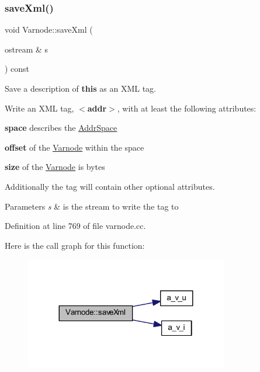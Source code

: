 \subsubsection{\texorpdfstring{saveXml()}{saveXml()}}
{\footnotesize\ttfamily void Varnode\+::save\+Xml (\begin{DoxyParamCaption}\item[{ostream \&}]{s }\end{DoxyParamCaption}) const}



Save a description of {\bfseries{this}} as an X\+ML tag. 

Write an X\+ML tag, {\bfseries{$<$addr$>$}}, with at least the following attributes\+:
\begin{DoxyItemize}
\item {\bfseries{space}} describes the \mbox{\hyperlink{class_addr_space}{Addr\+Space}}
\item {\bfseries{offset}} of the \mbox{\hyperlink{class_varnode}{Varnode}} within the space
\item {\bfseries{size}} of the \mbox{\hyperlink{class_varnode}{Varnode}} is bytes
\end{DoxyItemize}

Additionally the tag will contain other optional attributes. 
\begin{DoxyParams}{Parameters}
{\em s} & is the stream to write the tag to \\
\hline
\end{DoxyParams}


Definition at line 769 of file varnode.\+cc.

Here is the call graph for this function\+:
\nopagebreak
\begin{figure}[H]
\begin{center}
\leavevmode
\includegraphics[width=251pt]{class_varnode_ab594852b697b20dea20d2f4d7551b8dd_cgraph}
\end{center}
\end{figure}
\mbox{\label{class_varnode_a61ae30aaf78c612ba253611e0aad2dc1}} 

